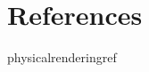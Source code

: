 \documentclass[preview]{standalone}
\begin{document}
\genpage

\nocite{*} %

\section{References}

\begin{snippet}{physicalrenderingref}
    \printbibliography[heading=none]
\end{snippet}
\end{document}
